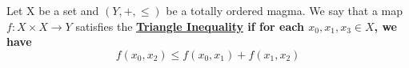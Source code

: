 \label{def:TriangleInequality}
\newcommand{\TriangleInequality}[0]{
    \bf \hyperref[def:TriangleInequality]{Triangle Inequality} \rm
}
\begin{df}
    
    Let X be a set and $(Y,+, \leq)$ be a totally ordered magma.
    We say that a map $f:X \times X \to Y$ satisfies the \TriangleInequality if for each $x_0,x_1,x_3 \in X$, we have
    \begin{equation*}
        f(x_0,x_2) \leq  f(x_0,x_1)+f(x_1,x_2)
        \end{equation*}
\end{df} 